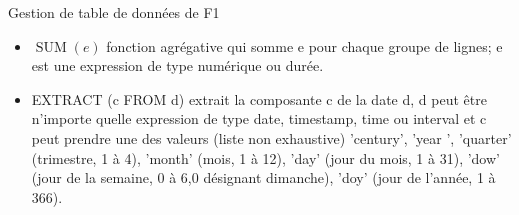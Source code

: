 \begin{exo}[PC][1][colle]{Gestion de table de données de F1}
\begin{itemize}
  \item $\operatorname{SUM}(e)$ fonction agrégative qui somme e pour chaque groupe de lignes; e est une expression de type numérique ou durée.

  \item EXTRACT (c FROM d) extrait la composante c de la date d, d peut être n'importe quelle expression de type date, timestamp, time ou interval et c peut prendre une des valeurs (liste non exhaustive) 'century', 'year ', 'quarter' (trimestre, 1 à 4), 'month' (mois, 1 à 12), 'day' (jour du mois, 1 à 31), 'dow' (jour de la semaine, 0 à 6,0 désignant dimanche), 'doy' (jour de l'année, 1 à 366).

\end{itemize}


\end{exo}
